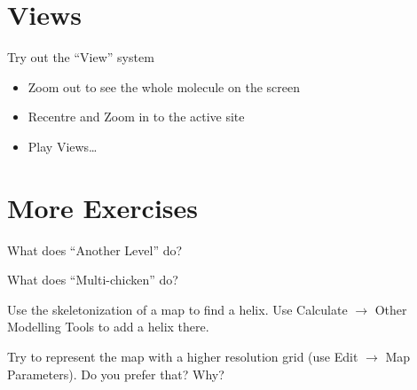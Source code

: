 \documentclass{article}
\begin{document}
\section{Views}

Try out the ``View'' system
\begin{itemize}
\item Zoom out to see the whole molecule on the screen
\item Recentre and Zoom in to the active site
\item Play Views\ldots
\end{itemize}


\section{More Exercises}
\begin{trivlist}
\item What does ``Another Level'' do? 
\item What does ``Multi-chicken'' do?
\item Use the skeletonization of a map to find a helix.  Use
  \textsf{Calculate $\rightarrow$ Other Modelling Tools} to add a
  helix there.
\item Try to represent the map with a higher resolution grid (use
  \textsf{Edit $\rightarrow$ Map Parameters}).  Do you prefer that?
  Why?
\end{trivlist}
\end{document}
